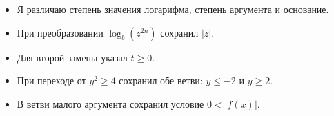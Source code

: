 \begin{selfcheck}
  \begin{itemize}
    \item Я различаю степень значения логарифма, степень аргумента и основание.
    \item При преобразовании \(\log_b(z^{2n})\) сохранил \(|z|\).
    \item Для второй замены указал \(t\ge0\).
    \item При переходе от \(y^2\ge4\) сохранил обе ветви:
      \(y\le-2\) и \(y\ge2\).
    \item В ветви малого аргумента сохранил условие \(0<|f(x)|\).
  \end{itemize}
\end{selfcheck}

